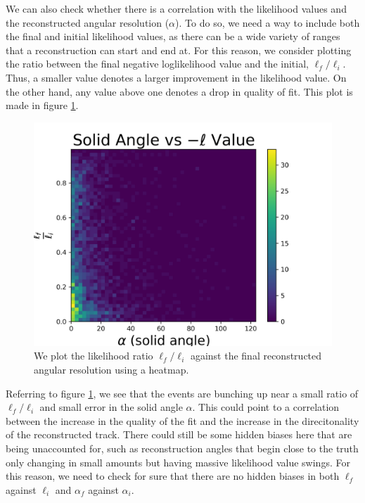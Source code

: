 We can also check whether there is a correlation with the likelihood values and the reconstructed angular resolution ($\alpha$). To do so, we need a way to include both the final and initial likelihood values, as there can be a wide variety of ranges that a reconstruction can start and end at. For this reason, we consider plotting the ratio between the final negative loglikelihood value and the initial, $\ell_{f}/\ell_{i}$. Thus, a smaller value denotes a larger improvement in the likelihood value. On the other hand, any value above one denotes a drop in quality of fit. This plot is made in figure \ref{fig:alpha_llhratio_comp}.

\begin{figure}[H]
  \centering
  \includegraphics[width=12cm]{./Figures/reco_plots/alpha_dist_vs_llhratio_heat.png}
  \caption{We plot the likelihood ratio $\ell_{f}/\ell_{i}$ against the final reconstructed angular resolution using a heatmap. }
  \label{fig:alpha_llhratio_comp}
\end{figure}

Referring to figure \ref{fig:alpha_llhratio_comp}, we see that the events are bunching up near a small ratio of $\ell_{f}/\ell_{i}$ and small error in the solid angle $\alpha$. This could point to a correlation between the increase in the quality of the fit and the increase in the direcitonality of the reconstructed track. There could still be some hidden biases here that are being unaccounted for, such as reconstruction angles that begin close to the truth only changing in small amounts but having massive likelihood value swings. For this reason, we need to check for sure that there are no hidden biases in both $\ell_{f}$ against $\ell_{i}$ and $\alpha_{f}$ against $\alpha_{i}$.

